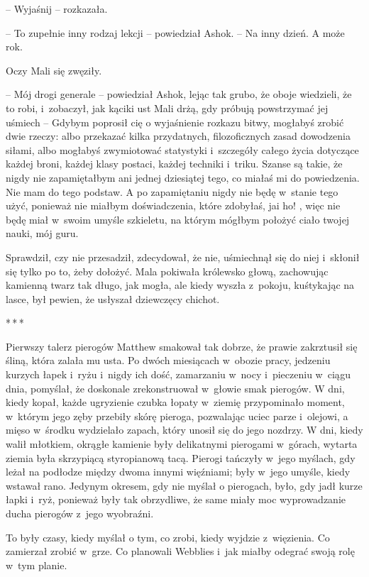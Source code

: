 \documentclass[oneside,polish,11pt,rmheadings]{mwbk}
\newcommand{\threeast}{\par\centerline{*\,*\,*}\medskip\par}
\begin{document}
-- Wyjaśnij -- rozkazała.

-- To zupełnie inny rodzaj lekcji -- powiedział Ashok. -- Na inny dzień. A może rok.

Oczy Mali  się zwęziły.

-- Mój drogi generale -- powiedział Ashok, lejąc tak grubo, że oboje wiedzieli, że to robi, i~zobaczył, jak kąciki ust Mali drżą, gdy próbują powstrzymać jej uśmiech -- Gdybym poprosił cię o wyjaśnienie rozkazu bitwy, mogłabyś zrobić dwie rzeczy: albo przekazać kilka przydatnych, filozoficznych zasad dowodzenia siłami, albo mogłabyś zwymiotować statystyki i~szczegóły całego życia dotyczące każdej broni, każdej klasy postaci, każdej techniki i~triku. Szanse są takie, że nigdy nie zapamiętałbym ani jednej dziesiątej tego, co miałaś mi do powiedzenia. Nie mam do tego podstaw. A po zapamiętaniu nigdy nie będę w~stanie tego użyć, ponieważ nie miałbym doświadczenia, które zdobyłaś, jai ho! , więc nie będę miał w~swoim umyśle szkieletu, na którym mógłbym położyć ciało twojej nauki, mój guru. 

Sprawdził, czy nie przesadził, zdecydował, że nie, uśmiechnął się do niej i~skłonił się tylko po to, żeby dołożyć. Mala pokiwała królewsko głową, zachowując kamienną twarz tak długo, jak mogła, ale kiedy wyszła z~pokoju, kuśtykając na lasce, był pewien, że usłyszał  dziewczęcy chichot.

\bigskip
\threeast

Pierwszy talerz pierogów Matthew smakował tak dobrze, że prawie zakrztusił się śliną, która zalała mu usta. Po dwóch miesiącach w~obozie pracy, jedzeniu kurzych łapek i~ryżu i~nigdy ich dość, zamarzaniu w~nocy i~pieczeniu w~ciągu dnia, pomyślał, że doskonale zrekonstruował w~głowie smak pierogów. W dni, kiedy kopał, każde ugryzienie czubka łopaty w~ziemię przypominało moment, w~którym jego zęby przebiły skórę pieroga, pozwalając uciec parze i~olejowi, a mięso w~środku wydzielało zapach, który unosił się do jego nozdrzy. W dni, kiedy walił młotkiem, okrągłe kamienie były delikatnymi pierogami w~górach, wytarta ziemia była skrzypiącą styropianową tacą. Pierogi tańczyły w~jego myślach, gdy leżał na podłodze między dwoma innymi więźniami; były w~jego umyśle, kiedy wstawał rano. Jedynym okresem, gdy nie myślał o pierogach, było, gdy jadł kurze łapki i~ryż, ponieważ były tak obrzydliwe, że same miały moc wyprowadzanie ducha pierogów z~jego wyobraźni.

To były czasy, kiedy myślał o tym, co zrobi, kiedy wyjdzie z~więzienia. Co zamierzał zrobić w~grze. Co planowali Webblies i~jak miałby odegrać swoją rolę w~tym planie.
\end{document}
